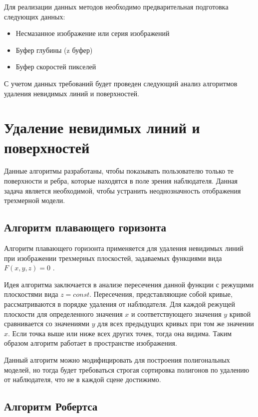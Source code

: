 \par
Для реализации данных методов необходимо предварительная подготовка следующих данных:
\begin{itemize}
    \item Несмазанное изображение или серия изображений
    \item Буфер глубины (z буфер)
    \item Буфер скоростей пикселей  
\end{itemize}
\par 
С учетом данных требований будет проведен следующий анализ алгоритмов удаления невидимых линий и поверхностей.


\section{Удаление невидимых линий и поверхностей}

Данные алгоритмы разработаны, чтобы показывать пользователю только те поверхности и ребра, которые находятся в поле зрения наблюдателя. Данная задача является необходимой, чтобы устранить неоднозначность отображения трехмерной модели.

\subsection{Алгоритм плавающего горизонта}

Алгоритм плавающего горизонта применяется для удаления невидимых линий при изображении трехмерных плоскостей, задаваемых функциями вида $F(x,y,z) = 0$  \cite{Rogers89}. 
\par
Идея алгоритма заключается в анализе пересечения данной функции с режущими плоскостями вида $z = const$. Пересечения, представляющие собой кривые, рассматриваются в порядке удаления от наблюдателя. Для каждой режущей плоскости для определенного значения $x$  и соответствующего значения $y$ кривой сравнивается со значениями $y$ для всех предыдущих кривых при том же значении $x$. Если точка выше или ниже всех других точек, тогда она видима. Таким образом алгоритм работает в пространстве изображения.
\par
Данный алгоритм можно модифицировать для построения полигональных моделей, но тогда будет требоваться строгая сортировка полигонов по удалению от наблюдателя, что не в каждой сцене достижимо.

\subsection{Алгоритм Робертса}

